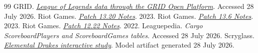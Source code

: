 \documentclass[10pt,letterpaper]{article}
\begin{document}
\begin{thebibliography}{99}
\scriptsize
\setlength{\parskip}{0pt}
\setlength{\itemsep}{0pt}
\setlength{\parsep}{0pt}
 GRID. \href{https://grid.gg/get-league-of-legends/}{\textit{League of Legends data through the GRID Open Platform}}. Accessed 28 July 2026.
 Riot Games. \href{https://www.leagueoflegends.com/en-sg/news/game-updates/patch-13-20-notes/}{\textit{Patch 13.20 Notes}}. 2023.
 Riot Games. \href{https://www.leagueoflegends.com/en-au/news/game-updates/patch-13-6-notes/}{\textit{Patch 13.6 Notes}}. 2023.
 Riot Games. \href{https://www.leagueoflegends.com/en-us/news/game-updates/patch-12-22-notes/}{\textit{Patch 12.22 Notes}}. 2022.
 Leaguepedia. \textit{Cargo ScoreboardPlayers and ScoreboardGames tables}. Accessed 28 July 2026.
 Scryglass. \href{https://scryglass-elemental-drakes.vercel.app}{\textit{Elemental Drakes interactive study}}. Model artifact generated 28 July 2026.
\end{thebibliography}
\end{document}
